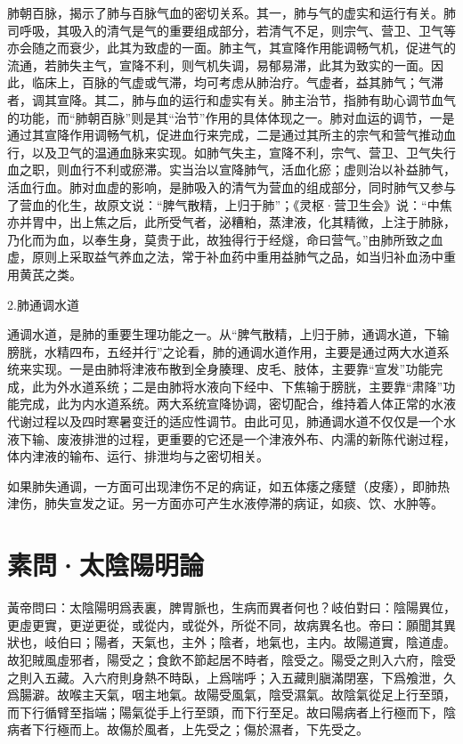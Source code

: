 \documentclass[12pt]{ctexbook}
\begin{document}
肺朝百脉，揭示了肺与百脉气血的密切关系。其一，肺与气的虚实和运行有关。肺司呼吸，其吸入的清气是气的重要组成部分，若清气不足，则宗气、营卫、卫气等亦会随之而衰少，此其为致虚的一面。肺主气，其宣降作用能调畅气机，促进气的流通，若肺失主气，宣降不利，则气机失调，易郁易滞，此其为致实的一面。因此，临床上，百脉的气虚或气滞，均可考虑从肺治疗。气虚者，益其肺气；气滞者，调其宣降。其二，肺与血的运行和虚实有关。肺主治节，指肺有助心调节血气的功能，而“肺朝百脉”则是其“治节”作用的具体体现之一。肺对血运的调节，一是通过其宣降作用调畅气机，促进血行来完成，二是通过其所主的宗气和营气推动血行，以及卫气的温通血脉来实现。如肺气失主，宣降不利，宗气、营卫、卫气失行血之职，则血行不利或瘀滞。实当治以宣降肺气，活血化瘀；虚则治以补益肺气，活血行血。肺对血虚的影响，是肺吸入的清气为营血的组成部分，同时肺气又参与了营血的化生，故原文说：“脾气散精，上归于肺”；《灵枢·营卫生会》说：“中焦亦并胃中，出上焦之后，此所受气者，泌糟粕，蒸津液，化其精微，上注于肺脉，乃化而为血，以奉生身，莫贵于此，故独得行于经燧，命曰营气。”由肺所致之血虚，原则上采取益气养血之法，常于补血药中重用益肺气之品，如当归补血汤中重用黄芪之类。

2.肺通调水道

通调水道，是肺的重要生理功能之一。从“脾气散精，上归于肺，通调水道，下输膀胱，水精四布，五经并行”之论看，肺的通调水道作用，主要是通过两大水道系统来实现。一是由肺将津液布散到全身腠理、皮毛、肢体，主要靠“宣发”功能完成，此为外水道系统；二是由肺将水液向下经中、下焦输于膀胱，主要靠“肃降”功能完成，此为内水道系统。两大系统宣降协调，密切配合，维持着人体正常的水液代谢过程以及四时寒暑变迁的适应性调节。由此可见，肺通调水道不仅仅是一个水液下输、废液排泄的过程，更重要的它还是一个津液外布、内濡的新陈代谢过程，体内津液的输布、运行、排泄均与之密切相关。

如果肺失通调，一方面可出现津伤不足的病证，如五体痿之痿躄（皮痿），即肺热津伤，肺失宣发之证。另一方面亦可产生水液停滞的病证，如痰、饮、水肿等。

\section{素問·太陰陽明論}%


\begin{yuanwen}
黃帝問曰：太陰陽明爲表裏，脾胃脈也，生病而異者何也？岐伯對曰：陰陽異位，更虛更實，更逆更從，或從内，或從外，所從不同，故病異名也。帝曰：願聞其異狀也，岐伯曰；陽者，天氣也，主外；陰者，地氣也，主内。故陽道實，陰道虛。故犯賊風虛邪者，陽受之；食飲不節起居不時者，陰受之。陽受之則入六府，陰受之則入五藏。入六府則身熱不時臥，上爲喘呼；入五藏則䐜滿閉塞，下爲飧泄，久爲腸澼。故喉主天氣，咽主地氣。故陽受風氣，陰受濕氣。故陰氣從足上行至頭，而下行循臂至指端；陽氣從手上行至頭，而下行至足。故曰陽病者上行極而下，陰病者下行極而上。故傷於風者，上先受之；傷於濕者，下先受之。
\end{yuanwen}
\end{document}
